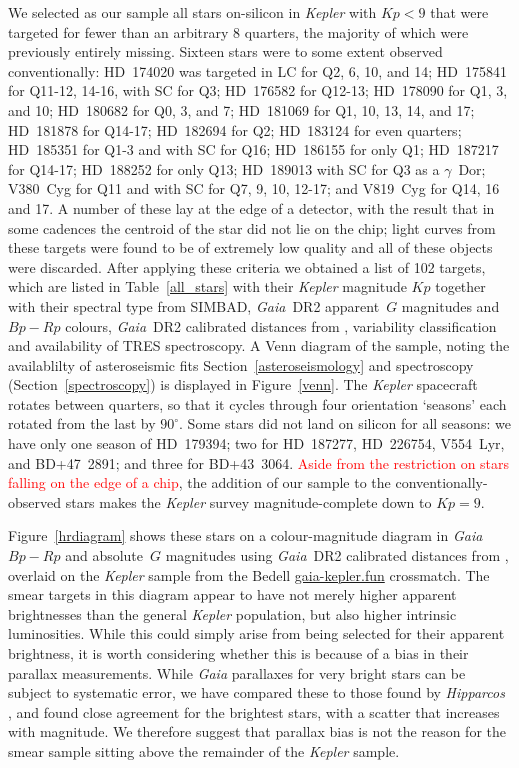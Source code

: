 \documentclass[a4paper,fleqn,usenatbib]{mnras}
\newcommand{\kepler}{\emph{Kepler}\xspace}
\newcommand{\gaia}{\emph{Gaia}\xspace}
\begin{document}
We selected as our sample all stars on-silicon in \kepler with $Kp<9$ that were targeted for fewer than an arbitrary $8$ quarters, the majority of which were previously entirely missing. Sixteen stars were to some extent observed conventionally: HD~174020 was targeted in LC for Q2, 6, 10, and 14; HD~175841 for Q11-12, 14-16, with SC for Q3; HD~176582 for Q12-13; HD~178090 for Q1, 3, and 10; HD~180682 for Q0, 3, and 7; HD~181069 for Q1, 10, 13, 14, and 17; HD~181878 for Q14-17; HD~182694 for Q2; HD~183124 for even quarters; HD~185351 for Q1-3 and with SC for Q16; HD~186155 for only Q1; HD~187217 for Q14-17; HD~188252 for only Q13; HD~189013 with SC for Q3 as a $\gamma$~Dor; V380~Cyg for Q11 and with SC for Q7, 9, 10, 12-17; and V819~Cyg for Q14, 16 and 17. A number of these lay at the edge of a detector, with the result that in some cadences the centroid of the star did not lie on the chip; light curves from these targets were found to be of extremely low quality and all of these objects were discarded. After applying these criteria we obtained a list of 102 targets, which are listed in Table~\ref{all_stars} with their \kepler magnitude $Kp$ together with their spectral type from SIMBAD, \gaia~DR2 apparent~$G$ magnitudes and $Bp-Rp$ colours, \gaia~DR2 calibrated distances from \citet{gaiadists}, variability classification and availability of TRES spectroscopy. A Venn diagram of the sample, noting the availablilty of asteroseismic fits Section~\ref{asteroseismology} and spectroscopy (Section~\ref{spectroscopy}) is displayed in Figure~\ref{venn}. The \kepler spacecraft rotates between quarters, so that it cycles through four orientation `seasons' each rotated from the last by $90^{\circ}$. Some stars did not land on silicon for all seasons: we have only one season of HD~179394; two for HD~187277, HD~226754, V554~Lyr, and BD+47~2891; and three for BD+43~3064. \textcolor{red}{Aside from the restriction on stars falling on the edge of a chip}, the addition of our sample to the conventionally-observed stars makes the \kepler survey magnitude-complete down to $Kp=9$.

Figure~\ref{hrdiagram} shows these stars on a colour-magnitude diagram in \gaia $Bp-Rp$ and absolute~$G$ magnitudes using \gaia~DR2 calibrated distances from \citet{gaiadists}, overlaid on the \kepler sample from the Bedell \url{gaia-kepler.fun} crossmatch. The smear targets in this diagram appear to have not merely higher apparent brightnesses than the general \kepler population, but also higher intrinsic luminosities. While this could simply arise from being selected for their apparent brightness, it is {}worth considering whether this is because of a bias in their parallax measurements. While \gaia parallaxes for very bright stars can be subject to systematic error, we have compared these to those found by \emph{Hipparcos} \citep{vanleeuwen07b}, and found close agreement for the brightest stars, with a scatter that increases with magnitude. We therefore suggest that parallax bias is not the reason for the smear sample sitting above the remainder of the \kepler sample.
\end{document}
